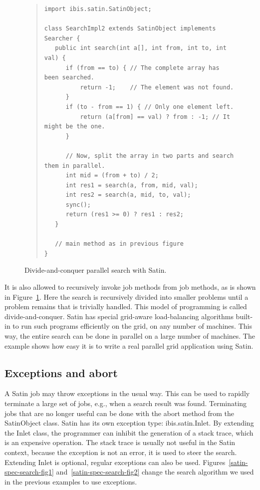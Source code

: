 \documentclass[10pt]{article}
\newcommand{\mysubsection}[1]{\subsection{#1}\label{#1}}
\begin{document}
\begin{figure}[t!]
\small{
\begin{quote}
\begin{verbatim}
import ibis.satin.SatinObject;

class SearchImpl2 extends SatinObject implements Searcher {
   public int search(int a[], int from, int to, int val) {
      if (from == to) { // The complete array has been searched.
          return -1;    // The element was not found.
      }
      if (to - from == 1) { // Only one element left.
          return (a[from] == val) ? from : -1; // It might be the one.
      }

      // Now, split the array in two parts and search them in parallel.
      int mid = (from + to) / 2;
      int res1 = search(a, from, mid, val);
      int res2 = search(a, mid, to, val);
      sync();
      return (res1 >= 0) ? res1 : res2;
   }

   // main method as in previous figure
}
\end{verbatim}
\end{quote}
}
\caption{Divide-and-conquer parallel search with Satin.}
\label{satin-par-search-fig}
\end{figure}

It is also allowed to recursively invoke job methods from job methods,
as is shown in Figure~\ref{satin-par-search-fig}. Here the search is recursively divided into
smaller problems until a problem remains that is trivially
handled. This model of programming is called divide-and-conquer. Satin
has special grid-aware load-balancing algorithms built-in to run such
programs efficiently on the grid, on any number of machines. This way,
the entire search can be done in parallel on a large number of
machines. The example shows how easy it is to write a real parallel
grid application using Satin.  

\mysubsection{Exceptions and abort}

A Satin job may
throw exceptions in the usual way. This can be used to rapidly
terminate a large set of jobs, e.g., when a search result was
found. Terminating jobs that are no longer useful can be done with the
abort method from the SatinObject class.  Satin has its own exception
type: ibis.satin.Inlet.  By extending the Inlet class, the programmer
can inhibit the generation of a stack trace, which is an expensive
operation. The stack trace is usually not useful in the Satin context,
because the exception is not an error, it is used to steer the
search. Extending Inlet is optional, regular exceptions can also be
used. Figures~\ref{satin-spec-search-fig1} and~\ref{satin-spec-search-fig2} change the search algorithm we used in the previous
examples to use exceptions.
\end{document}
